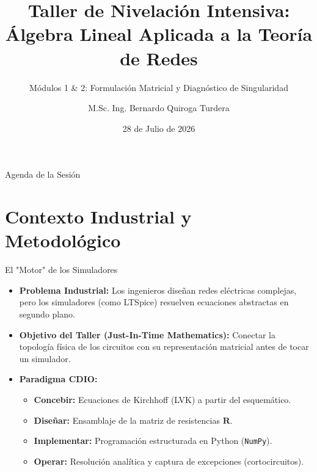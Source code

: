 \documentclass[aspectratio=169]{beamer}
\title[Nivelación - Sesión 1]{Taller de Nivelación Intensiva:\\ Álgebra Lineal Aplicada a la Teoría de Redes}
\subtitle{Módulos 1 \& 2: Formulación Matricial y Diagnóstico de Singularidad}
\author[M.Sc. Ing. B. Quiroga Turdera]{M.Sc. Ing. Bernardo Quiroga Turdera}
\institute[UCB Tarija]{Carrera de Ingeniería Mecatrónica\\ Universidad Católica Boliviana "San Pablo" Sede Tarija}
\date{28 de Julio de 2026}
\begin{document}
\begin{frame}
    \titlepage
\end{frame}

\begin{frame}{Agenda de la Sesión}
    \tableofcontents
\end{frame}

\section{Contexto Industrial y Metodológico}
\begin{frame}{El "Motor" de los Simuladores}
    \begin{itemize}
        \item \textbf{Problema Industrial:} Los ingenieros diseñan redes eléctricas complejas, pero los simuladores (como LTSpice) resuelven ecuaciones abstractas en segundo plano.
        \item \textbf{Objetivo del Taller (Just-In-Time Mathematics):} Conectar la topología física de los circuitos con su representación matricial antes de tocar un simulador.
        \item \textbf{Paradigma CDIO:} 
        \begin{itemize}
            \item \textbf{Concebir:} Ecuaciones de Kirchhoff (LVK) a partir del esquemático.
            \item \textbf{Diseñar:} Ensamblaje de la matriz de resistencias $\mathbf{R}$.
            \item \textbf{Implementar:} Programación estructurada en Python (\texttt{NumPy}).
            \item \textbf{Operar:} Resolución analítica y captura de excepciones (cortocircuitos).
        \end{itemize}
    \end{itemize}
\end{frame}
\end{document}
